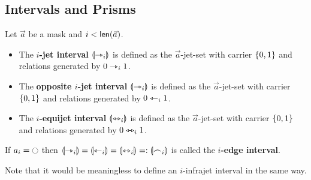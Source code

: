 \documentclass[a4paper]{memoir}
\begin{document}
\subsection{Intervals and Prisms}
\begin{definition} \label{def:interval}
	Let $\vec a$ be a mask and $i < \mathsf{len}(\vec a)$.
	\begin{itemize}
		\item The \textbf{$i$-jet interval} ${\llparenthesis \rightarrowtriangle_i \rrparenthesis}$ is defined as the $\vec a$-jet-set with carrier $\mathopen{}\left\{ 0, 1 \right\}\mathclose{}$ and relations generated by $0 \rightarrowtriangle_i 1$.
		\item The \textbf{opposite $i$-jet interval} ${\llparenthesis \rightarrowtriangle_i \rrparenthesis}$ is defined as the $\vec a$-jet-set with carrier $\mathopen{}\left\{ 0, 1 \right\}\mathclose{}$ and relations generated by $0 \leftarrowtriangle_i 1$.
		\item The \textbf{$i$-equijet interval} ${\llparenthesis \leftrightarrowtriangle_i \rrparenthesis}$ is defined as the $\vec a$-jet-set with carrier $\mathopen{}\left\{ 0, 1 \right\}\mathclose{}$ and relations generated by $0 \leftrightarrowtriangle_i 1$.
	\end{itemize}
	If $a_i = \npolar$ then ${\llparenthesis \rightarrowtriangle_i \rrparenthesis} = {\llparenthesis \leftarrowtriangle_i \rrparenthesis} = {\llparenthesis \leftrightarrowtriangle_i \rrparenthesis} =: {\llparenthesis \frown_i \rrparenthesis}$ is called the \textbf{$i$-edge interval}.
\end{definition}
Note that it would be meaningless to define an $i$-infrajet interval in the same way.
\end{document}
